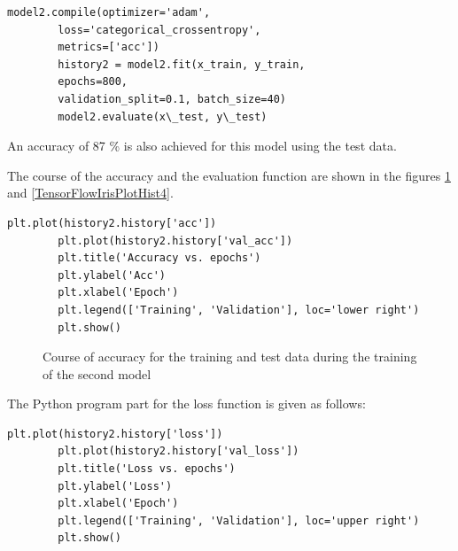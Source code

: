 \medskip

\begin{code}
    \begin{lstlisting}[numbers=none]
        model2.compile(optimizer='adam', 
        loss='categorical_crossentropy', 
        metrics=['acc'])
        history2 = model2.fit(x_train, y_train, 
        epochs=800, 
        validation_split=0.1, batch_size=40)
        model2.evaluate(x\_test, y\_test)
    \end{lstlisting}
    
    \caption{Training of the second model}
\end{code}


\medskip

An accuracy of 87 \% is also achieved for this model using the test data.

The course of the accuracy and the evaluation function are shown in the figures \ref{TensorFlowIrisPlotHist3} and \ref{TensorFlowIrisPlotHist4}. 


\begin{code}
    \begin{lstlisting}[numbers=none]
        plt.plot(history2.history['acc'])
        plt.plot(history2.history['val_acc'])
        plt.title('Accuracy vs. epochs')
        plt.ylabel('Acc')
        plt.xlabel('Epoch')
        plt.legend(['Training', 'Validation'], loc='lower right')
        plt.show()
    \end{lstlisting}
    
    \caption{Course of the accuracy and the evaluation function}
\end{code}


\begin{figure}[H]
    \caption{Course of accuracy for the training and test data during the training of the second model}
    \label{TensorFlowIrisPlotHist3}
\end{figure}


The Python program part for the loss function is given as follows:

\begin{code}
    \begin{lstlisting}[numbers=none]
        plt.plot(history2.history['loss'])
        plt.plot(history2.history['val_loss'])
        plt.title('Loss vs. epochs')
        plt.ylabel('Loss')
        plt.xlabel('Epoch')
        plt.legend(['Training', 'Validation'], loc='upper right')
        plt.show()
    \end{lstlisting}
    
    \caption{Course of the loss function}
\end{code}


